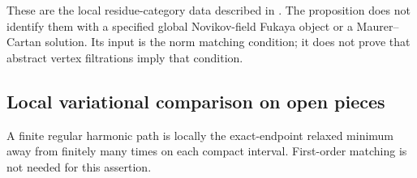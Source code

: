 These are the local residue-category data described in
\cite[\S4.4]{HKS24}. The proposition does not identify them with a
specified global Novikov-field Fukaya object or a Maurer--Cartan
solution. Its input is the norm matching condition; it does not
prove that abstract vertex filtrations imply that condition.

\subsection{Local variational comparison on open pieces}

\begin{lemma}\label{lem:openpiececonverse}
A finite regular harmonic path is locally the exact-endpoint
relaxed minimum away from finitely many times on each compact
interval. First-order matching is not needed for this assertion.
\end{lemma}

